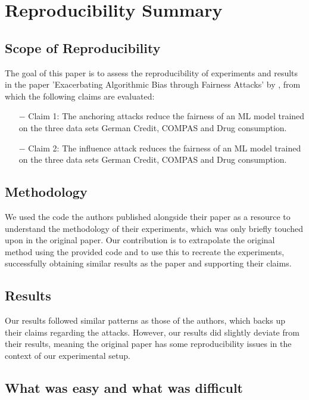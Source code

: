 \section{Reproducibility Summary}

\subsection*{Scope of Reproducibility}
The goal of this paper is to assess the reproducibility of experiments and results in the paper 'Exacerbating Algorithmic Bias through Fairness Attacks' by \cite{mehrabi2020exacerbating}, from which the following claims are evaluated:
\begin{itemize}
    \item[$-$] Claim 1: The anchoring attacks reduce the fairness of an ML model trained on the three data sets German Credit, COMPAS and Drug consumption.
    \item[$-$] Claim 2: The influence attack reduces the fairness of an ML model trained on the three data sets German Credit, COMPAS and Drug consumption.
\end{itemize}

\subsection*{Methodology}

We used the code the authors published alongside their paper as a resource to understand the methodology of their experiments, which was only briefly touched upon in the original paper. Our contribution is to extrapolate the original method using the provided code and to use this to recreate the experiments, successfully obtaining similar results as the paper and supporting their claims.

\subsection*{Results}
Our results followed similar patterns as those of the authors, which backs up their claims regarding the attacks. However, our results did slightly deviate from their results, meaning the original paper has some reproducibility issues in the context of our experimental setup.

\subsection*{What was easy and what was difficult}

